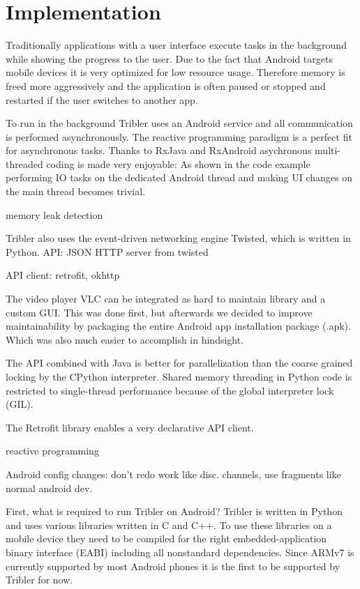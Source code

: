 \chapter{Implementation}


Traditionally applications with a user interface execute tasks in the background while showing the progress to the user.
Due to the fact that Android targets mobile devices it is very optimized for low resource usage.
Therefore memory is freed more aggressively and the application is often paused or stopped and restarted if the user switches to another app.

To run in the background Tribler uses an Android service and all communication is performed asynchronously.
The reactive programming paradigm is a perfect fit for asynchronous tasks.
Thanks to RxJava and RxAndroid asychronous multi-threaded coding is made very enjoyable:
As shown in the code example performing IO tasks on the dedicated Android thread and making UI changes on the main thread becomes trivial.


memory leak detection


Tribler also uses the event-driven networking engine Twisted, which is written in Python.
API: JSON HTTP server from twisted

API client: retrofit, okhttp


The video player VLC can be integrated as hard to maintain library and a custom GUI.
This was done first, but afterwards we decided to improve maintainability by packaging the entire Android app installation package (.apk).
Which was also much easier to accomplish in hindsight.

The API combined with Java is better for parallelization than the coarse grained locking by the CPython interpreter.
Shared memory threading in Python code is restricted to single-thread performance because of the global interpreter lock (GIL).


The Retrofit library enables a very declarative API client.

reactive programming



Android config changes: don't redo work like disc. channels, use fragments like normal android dev.




First, what is required to run Tribler on Android?
Tribler is written in Python and uses various libraries written in C and C++.
To use these libraries on a mobile device they need to be compiled for the right embedded-application binary interface (EABI) including all nonstandard dependencies.
Since ARMv7 is currently supported by most Android phones it is the first to be supported by Tribler for now.


